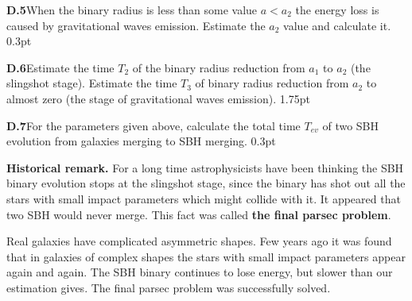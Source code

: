 \textbf{D.5}\quad When the binary radius is less than some value $a < a_2$ the
energy loss is caused by gravitational waves emission. Estimate the $a_2$ value
and calculate it. \hfill 0.3pt

\textbf{D.6}\quad Estimate the time $T_2$ of the binary radius reduction from
$a_1$ to $a_2$ (the slingshot stage). Estimate the time $T_3$ of binary radius
reduction from $a_2$ to almost zero (the stage of gravitational waves
emission). \hfill 1.75pt

\textbf{D.7}\quad For the parameters given above, calculate the total time
$T_{ev}$ of two SBH evolution from galaxies merging to SBH merging.
\hfill 0.3pt

\textbf{Historical remark.} For a long time astrophysicists have been thinking
the SBH binary evolution stops at the slingshot stage, since the binary has
shot out all the stars with small impact parameters which might collide with
it. It appeared that two SBH would never merge. This fact was called
\textbf{the final parsec problem}.

Real galaxies have complicated asymmetric shapes. Few years ago it was found
that in galaxies of complex shapes the stars with small impact parameters
appear again and again. The SBH binary continues to lose energy, but slower
than our estimation gives. The final parsec problem was successfully solved.

